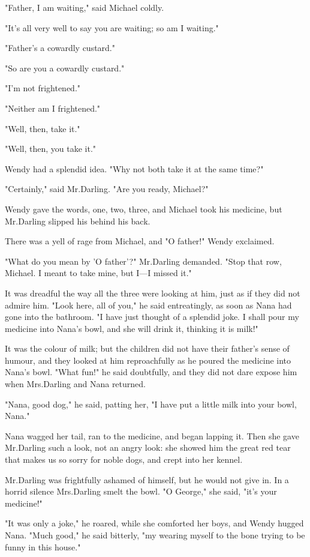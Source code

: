 "Father, I am waiting," said Michael coldly.

"It's all very well to say you are waiting;
so am I waiting."

"Father's a cowardly custard."

"So are you a cowardly custard."

"I'm not frightened."

"Neither am I frightened."

"Well, then, take it."

"Well, then, you take it."

Wendy had a splendid idea.
"Why not both take it at the same time?"

"Certainly," said Mr.\@ Darling.
"Are you ready, Michael?"

Wendy gave the words, one, two, three, and Michael took his medicine, but Mr.\@ Darling slipped his behind his back.

There was a yell of rage from Michael, and "O father!\@" Wendy exclaimed.

"What do you mean by 'O father'?\@" Mr.\@ Darling demanded.
"Stop that row, Michael.
I meant to take mine, but I—I missed it."

It was dreadful the way all the three were looking at him, just as if they did not admire him.
"Look here, all of you," he said entreatingly, as soon as Nana had gone into the bathroom.
"I have just thought of a splendid joke.
I shall pour my medicine into Nana's bowl, and she will drink it, thinking it is milk!"

It was the colour of milk;
but the children did not have their father's sense of humour, and they looked at him reproachfully as he poured the medicine into Nana's bowl.
"What fun!\@" he said doubtfully, and they did not dare expose him when Mrs.\@ Darling and Nana returned.

"Nana, good dog," he said, patting her, "I have put a little milk into your bowl, Nana."

Nana wagged her tail, ran to the medicine, and began lapping it.
Then she gave Mr.\@ Darling such a look, not an angry look:
she showed him the great red tear that makes us so sorry for noble dogs, and crept into her kennel.

Mr.\@ Darling was frightfully ashamed of himself, but he would not give in.
In a horrid silence Mrs.\@ Darling smelt the bowl.
"O George," she said, "it's your medicine!"

"It was only a joke," he roared, while she comforted her boys, and Wendy hugged Nana.
"Much good," he said bitterly, "my wearing myself to the bone trying to be funny in this house."

